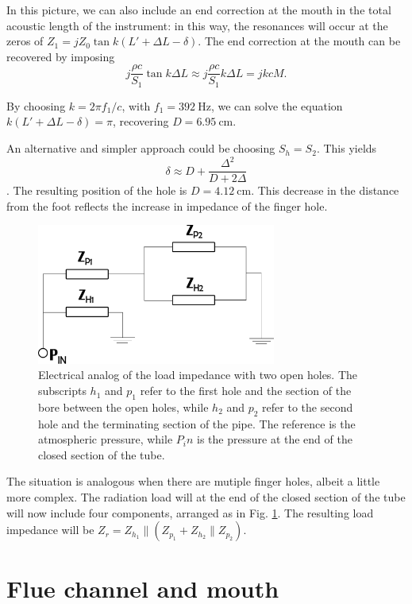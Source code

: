 \documentclass[a4paper]{article}
\begin{document}
In this picture, we can also include an end correction at the mouth in the total acoustic length of the instrument: in this way, the resonances will occur at the zeros of $Z_1 = jZ_0 \tan k(L' + \Delta L - \delta)$. The end correction at the mouth can be recovered by imposing $$j \frac{\rho c}{S_1} \tan k\Delta L \approx j \frac{\rho c}{S_1} k\Delta L = jkcM. $$

By choosing $k = 2\pi f_1/c$, with $f_1 = 392~\si{\hertz}$, we can solve the equation $k(L' + \Delta L - \delta) = \pi$, recovering $D = 6.95~\si{\centi\meter}.$

An alternative and simpler approach could be choosing $S_h = S_2$. This yields $$ \delta \approx D + \frac{\Delta^2}{D +2\Delta}$$. The resulting position of the hole is $D = 4.12~\si{\centi\meter}$. This decrease in the distance from the foot reflects the increase in impedance of the finger hole.

\begin{figure}
	\centering
	\includegraphics[width=0.7\textwidth]{twoholes.pdf}
	\caption{Electrical analog of the load impedance with two open holes. The subscripts $h_1$ and $p_1$ refer to the first hole and the section of the bore between the open holes, while $h_2$ and $p_2$ refer to the second hole and the terminating section of the pipe. The reference is the atmospheric pressure, while $P_in$ is the pressure at the end of the closed section of the tube.}
	\label{fig:holes}
\end{figure}

The situation is analogous when there are mutiple finger holes, albeit a little more complex. The radiation load will at the end of the closed section of the tube will now include four components, arranged as in Fig. \ref{fig:holes}. The resulting load impedance will be $Z_r = Z_{h_1}\parallel\left(Z_{p_1} + Z_{h_2}\parallel Z_{p_2} \right)$.

\section{Flue channel and mouth}
\end{document}
